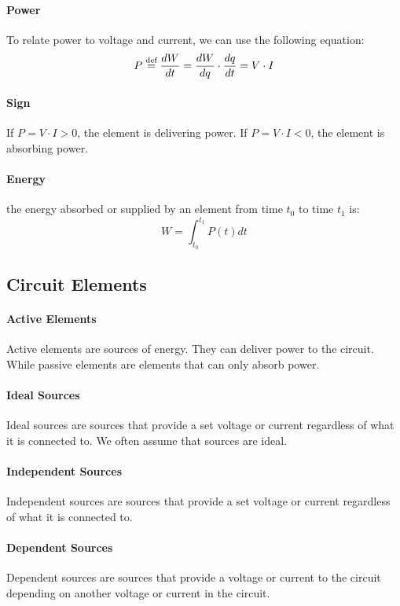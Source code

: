 \documentclass[11pt]{article}
\begin{document}
\paragraph{Power} To relate power to  voltage and current, we can use the following equation:
\begin{equation}
    P \stackrel{\text{def}}{=} \frac{dW}{dt} = \frac{dW}{dq} \cdot \frac{dq}{dt} = V \cdot I
\end{equation}
\paragraph{Sign} If $P = V \cdot I > 0$, the element is delivering power. If $P = V \cdot I < 0$, the element is absorbing power.
\paragraph{Energy}  the energy absorbed or supplied by an element
from time $t_0$ to time $t_1$ is:
\begin{equation}
    W = \int_{t_0}^{t_1} P(t) dt
\end{equation}
\subsection{Circuit Elements}
\paragraph{Active Elements} Active elements are sources of energy. They can deliver power to the circuit. While passive elements are elements that can only absorb power.
\paragraph{Ideal Sources} Ideal sources are sources that provide a set voltage or current regardless of what it is connected to. We often assume that sources are ideal.
\paragraph{Independent Sources} Independent sources are sources that provide a set voltage or current regardless of what it is connected to.
\paragraph{Dependent Sources} Dependent sources are sources that provide a voltage or current to the circuit depending on another voltage or current in the circuit.
\end{document}
